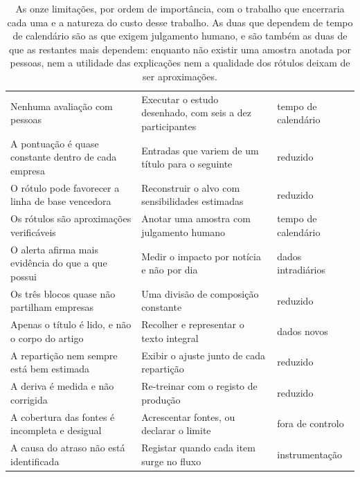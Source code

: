 \begin{table}[!htbp]
\caption[As limitações e o trabalho que as encerraria]{As onze limitações, por ordem de
importância, com o trabalho que encerraria cada uma e a natureza do custo desse trabalho. As duas
que dependem de tempo de calendário são as que exigem julgamento humano, e são também as duas de
que as restantes mais dependem: enquanto não existir uma amostra anotada por pessoas, nem a
utilidade das explicações nem a qualidade dos rótulos deixam de ser aproximações.}
\label{tab:con_limites}
\centering
\footnotesize
\begin{tabular}{@{}L{0.33\textwidth} L{0.32\textwidth} L{0.20\textwidth}@{}}
\toprule
{} &  &  \\
\midrule
Nenhuma avaliação com pessoas & Executar o estudo desenhado, com seis a dez participantes &
tempo de calendário \\
A pontuação é quase constante dentro de cada empresa & Entradas que variem de um título para o
seguinte & reduzido \\
O rótulo pode favorecer a linha de base vencedora & Reconstruir o alvo com sensibilidades
estimadas & reduzido \\
Os rótulos são aproximações verificáveis & Anotar uma amostra com julgamento humano &
tempo de calendário \\
O alerta afirma mais evidência do que a que possui & Medir o impacto por notícia e não por dia &
dados intradiários \\
Os três blocos quase não partilham empresas & Uma divisão de composição constante & reduzido \\
Apenas o título é lido, e não o corpo do artigo & Recolher e representar o texto integral &
dados novos \\
A repartição nem sempre está bem estimada & Exibir o ajuste junto de cada repartição & reduzido \\
A deriva é medida e não corrigida & Re-treinar com o registo de produção & reduzido \\
A cobertura das fontes é incompleta e desigual & Acrescentar fontes, ou declarar o limite &
fora de controlo \\
A causa do atraso não está identificada & Registar quando cada item surge no fluxo &
instrumentação \\
\bottomrule
\end{tabular}
\end{table}

